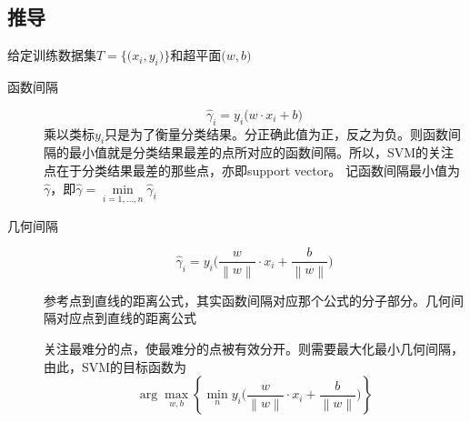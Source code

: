 \documentclass{ctexart}
\begin{document}

\subsection{推导}
\label{derivations}
给定训练数据集$T=\big\{\big(x_i,y_i\big)\big\}$和超平面$\big(w,b\big)$
\begin{description}
\item[函数间隔]
\begin{equation}
\hat{\gamma}_i = y_i\big(w\cdot x_i+b\big)
\end{equation}
乘以类标$y_i$只是为了衡量分类结果。分正确此值为正，反之为负。则函数间隔的最小值就是分类结果最差的点所对应的函数间隔。所以，SVM的关注点在于分类结果最差的那些点，亦即support vector。
记函数间隔最小值为$\hat{\gamma}$，即$\hat{\gamma}=\min\limits_{i=1,\dots,n}\hat{\gamma}_i$


\item[几何间隔]
\begin{equation}
\hat{\gamma}_i = y_i\big(\frac{w}{\left\|w\right\|}\cdot x_i+\frac{b}{ \left \|w\right \| }   \big)
\end{equation}

参考点到直线的距离公式，其实函数间隔对应那个公式的分子部分。几何间隔对应点到直线的距离公式

关注最难分的点，使最难分的点被有效分开。则需要最大化最小几何间隔，由此，SVM的目标函数为
\begin{equation}
\arg\max\limits_{w,b}\left\{ \min\limits_{n}y_i\big(\frac{w}{\left\|w\right\|}\cdot x_i+\frac{b}{ \left \|w\right \| }   \big)\right\}
\end{equation}

%


\end{description}
\end{document}
